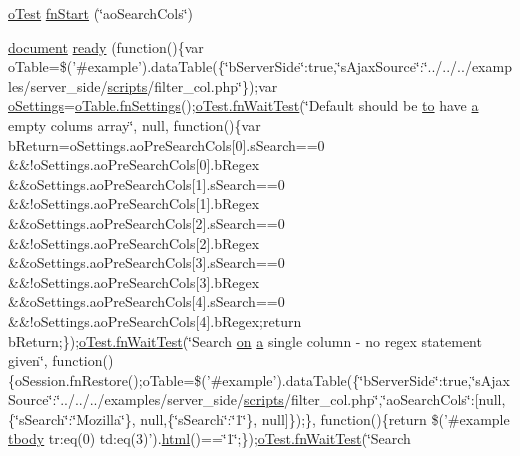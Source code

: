 \begin{DoxyCompactItemize}
\item 
\hyperlink{unit__test_8js_a3b2d259e2df3b6860d9047a92d09d0d6}{o\+Test} \hyperlink{4__server-side_2ao_search_cols_8js_a0803a71fb3c1673d3aea890c26befda6}{fn\+Start} (\char`\"{}ao\+Search\+Cols\char`\"{})
\item 
\hyperlink{outside_events_8js_aa14f8e0338cced6720590fd2ea13bd4b}{document} \hyperlink{4__server-side_2ao_search_cols_8js_a9b2661185c2a5e37753884d30380a80a}{ready} (function()\{var o\+Table=\$('\#example').data\+Table(\{\char`\"{}b\+Server\+Side\char`\"{}\+:true,\char`\"{}s\+Ajax\+Source\char`\"{}\+:\char`\"{}../../../examples/server\+\_\+side/\hyperlink{tinymce_8jquery_8dev_8js_a09066d4d580eeec222f858d588b4cdef}{scripts}/filter\+\_\+col.\+php\char`\"{}\});var \hyperlink{model_8settings_8js_a4857b9c813b4dea010668e9555d0aca7}{o\+Settings}=\hyperlink{api_8methods_8js_a78f387fab92a85c2cb7830bc5d8a6141}{o\+Table.\+fn\+Settings}();\hyperlink{onhold_24__server-side_2__zero__config_8js_ab25c4d596771c0133cdc45178ce72c3d}{o\+Test.\+fn\+Wait\+Test}(\char`\"{}Default should be \hyperlink{jquery-ui_8js_af6086621f45baa2cf538f19e45d3c263}{to} have \hyperlink{media_2js_2jquery_8js_aa4d4888597588a84fd5b1184d00c91f3}{a} empty colums array\char`\"{}, null, function()\{var b\+Return=o\+Settings.\+ao\+Pre\+Search\+Cols\mbox{[}0\mbox{]}.s\+Search==0 \&\&!o\+Settings.\+ao\+Pre\+Search\+Cols\mbox{[}0\mbox{]}.b\+Regex \&\&o\+Settings.\+ao\+Pre\+Search\+Cols\mbox{[}1\mbox{]}.s\+Search==0 \&\&!o\+Settings.\+ao\+Pre\+Search\+Cols\mbox{[}1\mbox{]}.b\+Regex \&\&o\+Settings.\+ao\+Pre\+Search\+Cols\mbox{[}2\mbox{]}.s\+Search==0 \&\&!o\+Settings.\+ao\+Pre\+Search\+Cols\mbox{[}2\mbox{]}.b\+Regex \&\&o\+Settings.\+ao\+Pre\+Search\+Cols\mbox{[}3\mbox{]}.s\+Search==0 \&\&!o\+Settings.\+ao\+Pre\+Search\+Cols\mbox{[}3\mbox{]}.b\+Regex \&\&o\+Settings.\+ao\+Pre\+Search\+Cols\mbox{[}4\mbox{]}.s\+Search==0 \&\&!o\+Settings.\+ao\+Pre\+Search\+Cols\mbox{[}4\mbox{]}.b\+Regex;return b\+Return;\});\hyperlink{onhold_24__server-side_2__zero__config_8js_ab25c4d596771c0133cdc45178ce72c3d}{o\+Test.\+fn\+Wait\+Test}(\char`\"{}Search \hyperlink{fullpage_2plugin_8min_8js_a1cfa98b7fed2aaf9fee3b68dbb7f9497}{on} \hyperlink{media_2js_2jquery_8js_aa4d4888597588a84fd5b1184d00c91f3}{a} single column -\/ no regex statement given\char`\"{}, function()\{o\+Session.\+fn\+Restore();o\+Table=\$('\#example').data\+Table(\{\char`\"{}b\+Server\+Side\char`\"{}\+:true,\char`\"{}s\+Ajax\+Source\char`\"{}\+:\char`\"{}../../../examples/server\+\_\+side/\hyperlink{tinymce_8jquery_8dev_8js_a09066d4d580eeec222f858d588b4cdef}{scripts}/filter\+\_\+col.\+php\char`\"{},\char`\"{}ao\+Search\+Cols\char`\"{}\+:\mbox{[}null,\{\char`\"{}s\+Search\char`\"{}\+:\char`\"{}Mozilla\char`\"{}\}, null,\{\char`\"{}s\+Search\char`\"{}\+:\char`\"{}1\char`\"{}\}, null\mbox{]}\});\}, function()\{return \$('\#example \hyperlink{core_8constructor_8js_a99b0542c7c50fe8757c55bf9dac5f3be}{tbody} tr\+:eq(0) td\+:eq(3)').\hyperlink{tinymce_8jquery_8dev_8js_ac2090bcf2ff968c0083d5de53a6544f3}{html}()==\char`\"{}1\char`\"{};\});\hyperlink{onhold_24__server-side_2__zero__config_8js_ab25c4d596771c0133cdc45178ce72c3d}{o\+Test.\+fn\+Wait\+Test}(\char`\"{}Search 
\end{DoxyCompactItemize}

